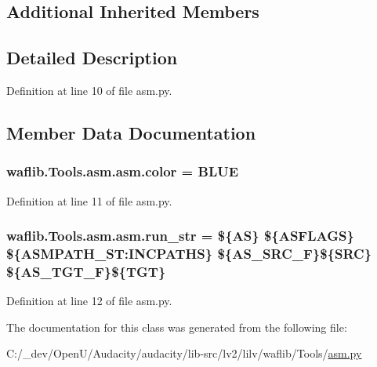\subsection*{Additional Inherited Members}


\subsection{Detailed Description}


Definition at line 10 of file asm.\+py.



\subsection{Member Data Documentation}
\subsubsection[{\texorpdfstring{color}{color}}]{ waflib.\+Tools.\+asm.\+asm.\+color = \textquotesingle{}B\+L\+UE\textquotesingle{}\hspace{0.3cm}{\ttfamily [static]}}\hypertarget{classwaflib_1_1_tools_1_1asm_1_1asm_ad677372e6c1acb52d3cb18a416757bfb}{}\label{classwaflib_1_1_tools_1_1asm_1_1asm_ad677372e6c1acb52d3cb18a416757bfb}


Definition at line 11 of file asm.\+py.

\subsubsection[{\texorpdfstring{run\+\_\+str}{run_str}}]{ waflib.\+Tools.\+asm.\+asm.\+run\+\_\+str = \textquotesingle{}\$\{AS\} \$\{A\+S\+F\+L\+A\+GS\} \$\{A\+S\+M\+P\+A\+T\+H\+\_\+\+S\+T\+:\+I\+N\+C\+P\+A\+T\+HS\} \$\{A\+S\+\_\+\+S\+R\+C\+\_\+F\}\$\{S\+RC\} \$\{A\+S\+\_\+\+T\+G\+T\+\_\+F\}\$\{T\+GT\}\textquotesingle{}\hspace{0.3cm}{\ttfamily [static]}}\hypertarget{classwaflib_1_1_tools_1_1asm_1_1asm_a80967e9b1e79690cdbce0e1797210e82}{}\label{classwaflib_1_1_tools_1_1asm_1_1asm_a80967e9b1e79690cdbce0e1797210e82}


Definition at line 12 of file asm.\+py.



The documentation for this class was generated from the following file\+:\begin{DoxyCompactItemize}
\item 
C\+:/\+\_\+dev/\+Open\+U/\+Audacity/audacity/lib-\/src/lv2/lilv/waflib/\+Tools/\hyperlink{lilv_2waflib_2_tools_2asm_8py}{asm.\+py}\end{DoxyCompactItemize}
